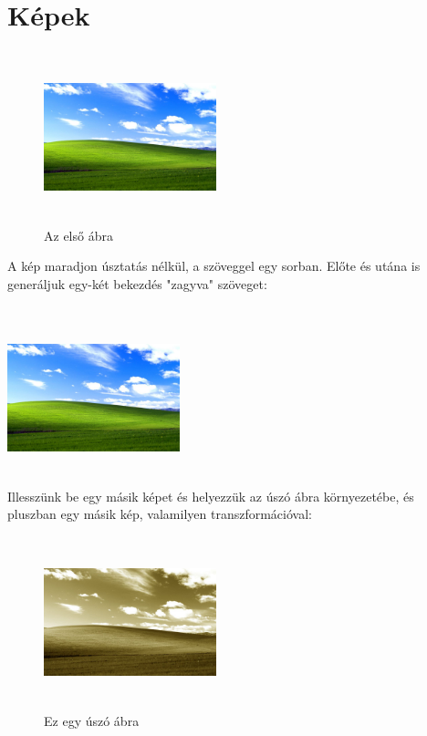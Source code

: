 \documentclass{article}
\begin{document}
\section{Képek}
\listoffigures %
\listoftables %

\begin{figure}
	\centering
	\includegraphics[width=5cm, height=5cm, keepaspectratio]{szines.jpg}
	\caption{Az első ábra}
\end{figure}

A kép maradjon úsztatás nélkül, a szöveggel egy sorban. Előte és utána is generáljuk egy-két bekezdés "zagyva" szöveget:\\\\
\lipsum[1]
\noindent\includegraphics[width=5cm, height=5cm, keepaspectratio]{szines.jpg}\hfill
\lipsum[2]\\

Illesszünk be egy másik képet és helyezzük az úszó ábra környezetébe, és pluszban egy másik kép, valamilyen transzformációval:\\
\begin{figure}[htbp]
	\centering
	\includegraphics[width=5cm, height=5cm, keepaspectratio]{szepia.jpg}
	\caption{Ez egy úszó ábra}
\end{figure}
\end{document}
